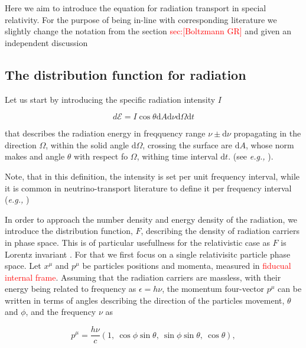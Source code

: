 \documentclass[11pt,a4paper,headinclude=true,DIV=14,BCOR=8mm,chapterprefix,listof=totoc,twoside,openright,abstracton]{scrbook}
\begin{document}
Here we aim to introduce the equation for radiation transport in special relativity. For the purpose of being in-line with corresponding literature we slightly change the notation from the section \textcolor{red}{sec:[Boltzmann GR]} and given an independent discussion

\subsection{The distribution function for radiation}

Let us start by introducing the specific radiation intensity $I$

\begin{equation}
    d\mathcal{E} = I \cos\theta\text{d}A\text{d}\nu\text{d}\Omega\text{d}t
    \label{eq:theory:boltz:specIntes}
\end{equation}

that describes the radiation energy in freqquency range $\nu\pm\text{d}\nu$ propagating in the direction $\Omega$, within the solid angle $\text{d}\Omega$, crossing the surface are $\text{d}A$, whose norm makes and angle $\theta$ with respect fo $\Omega$, withing time interval $\text{d}t$. (see \textit{e.g.,} \cite{Pomraning:1973}). 

Note, that in this definition, the intensity is set per unit frequency interval, while it is common in neutrino-transport literature to define it per frequency interval (\textit{e.g.,} \cite{Burrows:1999es})

In order to approach the number density and energy density of the radiation, we introduce the distribution function, $F$, describing the density of radiation carriers in phase space. This is of particular usefullness for the relativistic case as $F$ is Lorentz invariant \cite{Mihalas:1984}. For that we first focus on a single relativisitc particle phase space. Let $x^{\mu}$ and $p^{\mu}$ be particles positions and momenta, measured in \textcolor{red}{fiducual internal frame}. Assuming that the radiation carriers are massless, with their energy being related to frequency as $\epsilon = h\nu$, the momentum four-vector $p^{\mu}$ can be written in terms of angles describing the direction of the particles movement, $\theta$ and $\phi$, and the frequency $\nu$ as 

\begin{equation}
    p^{\mu} = \frac{h\nu}{c}(1, \: \cos\phi\sin\theta,\:\sin\phi\sin\theta,\:\cos\theta),
    \label{eq:theory:boltz:pmu}
\end{equation}
\end{document}
